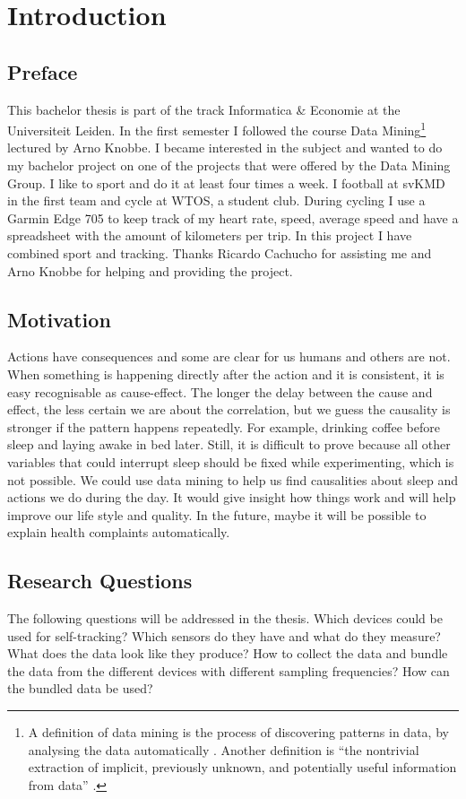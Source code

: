 \section{Introduction}
	\subsection{Preface}
		This bachelor thesis is part of the track Informatica \& Economie at the Universiteit Leiden. In the first semester I followed the course Data Mining\footnote{A definition of data mining is the process of discovering patterns in data, by analysing the data automatically \cite{datamining}. Another definition is ``the nontrivial extraction of implicit, previously unknown, and potentially useful information from data'' \cite{frawley}.} lectured by Arno Knobbe. I became interested in the subject and wanted to do my bachelor project on one of the projects that were offered by the Data Mining Group. I like to sport and do it at least four times a week. I football at svKMD in the first team and cycle at WTOS, a student club. During cycling I use a Garmin Edge 705 to keep track of my heart rate, speed, average speed and have a spreadsheet with the amount of kilometers per trip. In this project I have combined sport and tracking. Thanks Ricardo Cachucho for assisting me and Arno Knobbe for helping and providing the project.

	\subsection{Motivation}
		\label{seq:motivation}
		Actions have consequences and some are clear for us humans and others are not. When something is happening directly after the action and it is consistent, it is easy recognisable as cause-effect. The longer the delay between the cause and effect, the less certain we are about the correlation, but we guess the causality is stronger if the pattern happens repeatedly. For example, drinking coffee before sleep and laying awake in bed later. Still, it is difficult to prove because all other variables that could interrupt sleep should be fixed while experimenting, which is not possible. We could use data mining to help us find causalities about sleep and actions we do during the day. It would give insight how things work and will help improve our life style and quality. In the future, maybe it will be possible to explain health complaints automatically.

	\subsection{Research Questions}
		The following questions will be addressed in the thesis.
		Which devices could be used for self-tracking? Which sensors do they have and what do they measure? What does the data look like they produce?
		How to collect the data and bundle the data from the different devices with different sampling frequencies? How can the bundled data be used?
		
